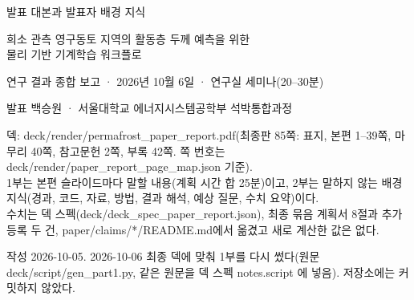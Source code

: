 \documentclass[11pt,a4paper]{article}
\newcommand{\pth}[1]{{\ttfamily\small #1}}
\begin{document}
\thispagestyle{empty}
\vspace*{0.16\textheight}
{\noindent\color{accent}\semibold\cjksemibold\huge 발표 대본과 발표자 배경 지식\par}
\vspace{1.0em}
{\noindent\semibold\cjksemibold\Large 희소 관측 영구동토 지역의 활동층 두께 예측을 위한\\물리 기반 기계학습 워크플로\par}
\vspace{1.0em}
{\noindent\large 연구 결과 종합 보고 · 2026년 10월 6일 · 연구실 세미나(20–30분)\par}
\vspace{2.2em}
{\noindent 발표 백승원 · 서울대학교 에너지시스템공학부 석박통합과정\par}
\vspace{2.6em}
{\noindent\color{textgray}\small
덱: \pth{deck/render/permafrost\_paper\_report.pdf}(최종판 85쪽: 표지, 본편 1–39쪽, 마무리 40쪽, 참고문헌 2쪽, 부록 42쪽. 쪽 번호는 \pth{deck/render/paper\_report\_page\_map.json} 기준).\\
1부는 본편 슬라이드마다 말할 내용(계획 시간 합 25분)이고, 2부는 말하지 않는 배경 지식(경과, 코드, 자료, 방법, 결과 해석, 예상 질문, 수치 요약)이다.\\
수치는 덱 스펙(\pth{deck/deck\_spec\_paper\_report.json}), 최종 묶음 계획서 8절과 추가 등록 두 건, \pth{paper/claims/*/README.md}에서 옮겼고 새로 계산한 값은 없다.\par}
\vfill
{\noindent\color{textgray}\small 작성 2026-10-05. 2026-10-06 최종 덱에 맞춰 1부를 다시 썼다(원문 \pth{deck/script/gen\_part1.py}, 같은 원문을 덱 스펙 notes.script 에 넣음). 저장소에는 커밋하지 않았다.\par}
\clearpage
\end{document}
